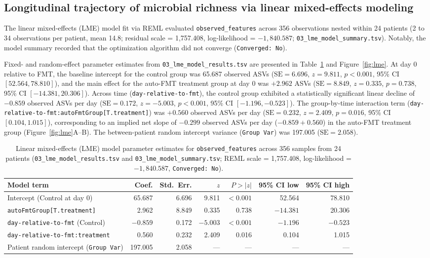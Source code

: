 \subsection{Longitudinal trajectory of microbial richness via linear mixed-effects modeling}
The linear mixed-effects (LME) model fit via REML evaluated \texttt{observed\_features} across 356 observations nested within 24 patients (2 to 34 observations per patient, mean 14.8; residual scale = 1,757.408, log-likelihood = $-1,840.587$; \texttt{03\_lme\_model\_summary.tsv}). Notably, the model summary recorded that the optimization algorithm did not converge (\texttt{Converged: No}).

Fixed- and random-effect parameter estimates from \texttt{03\_lme\_model\_results.tsv} are presented in Table~\ref{tab:lme} and Figure~\ref{fig:lme}. At day 0 relative to FMT, the baseline intercept for the control group was 65.687 observed ASVs ($\text{SE} = 6.696$, $z = 9.811$, $p < 0.001$, 95\% CI $[52.564, 78.810]$), and the main effect for the auto-FMT treatment group at day 0 was $+2.962$ ASVs ($\text{SE} = 8.849$, $z = 0.335$, $p = 0.738$, 95\% CI $[-14.381, 20.306]$). Across time (\texttt{day-relative-to-fmt}), the control group exhibited a statistically significant linear decline of $-0.859$ observed ASVs per day ($\text{SE} = 0.172$, $z = -5.003$, $p < 0.001$, 95\% CI $[-1.196, -0.523]$). The group-by-time interaction term (\texttt{day-relative-to-fmt:autoFmtGroup[T.treatment]}) was $+0.560$ observed ASVs per day ($\text{SE} = 0.232$, $z = 2.409$, $p = 0.016$, 95\% CI $[0.104, 1.015]$), corresponding to an implied net slope of $-0.299$ observed ASVs per day ($-0.859 + 0.560$) in the auto-FMT treatment group (Figure~\ref{fig:lme}A--B). The between-patient random intercept variance (\texttt{Group Var}) was 197.005 ($\text{SE} = 2.058$).

\begin{table}[t]
\centering
\footnotesize
\setlength{\tabcolsep}{3pt}
\caption{Linear mixed-effects (LME) model parameter estimates for \texttt{observed\_features} across 356 samples from 24 patients (\texttt{03\_lme\_model\_results.tsv} and \texttt{03\_lme\_model\_summary.tsv}; REML scale = 1,757.408, log-likelihood = $-1,840.587$, \texttt{Converged: No}).}
\label{tab:lme}
\begin{tabular}{lrrrrrr}
\toprule
Model term & Coef. & Std.\ Err. & $z$ & $P > |z|$ & 95\% CI low & 95\% CI high \\
\midrule
Intercept (Control at day 0) & 65.687 & 6.696 & 9.811 & $< 0.001$ & 52.564 & 78.810 \\
\texttt{autoFmtGroup[T.treatment]} & 2.962 & 8.849 & 0.335 & 0.738 & $-14.381$ & 20.306 \\
\texttt{day-relative-to-fmt} (Control) & $-0.859$ & 0.172 & $-5.003$ & $< 0.001$ & $-1.196$ & $-0.523$ \\
\texttt{day-relative-to-fmt:treatment} & 0.560 & 0.232 & 2.409 & 0.016 & 0.104 & 1.015 \\
\midrule
Patient random intercept (\texttt{Group Var}) & 197.005 & 2.058 & --- & --- & --- & --- \\
\bottomrule
\end{tabular}
\end{table}

